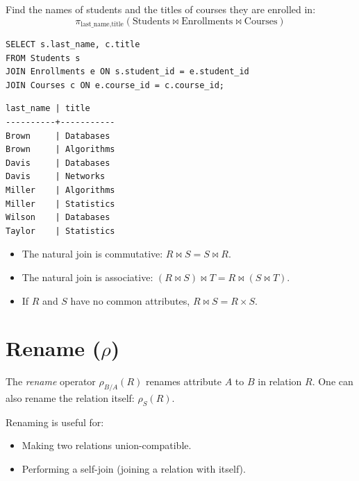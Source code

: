 \begin{example}
Find the names of students and the titles of courses they are enrolled in:
\[
\pi_{\text{last\_name}, \text{title}}(\text{Students} \bowtie \text{Enrollments} \bowtie \text{Courses})
\]

\begin{codeblock}[title=\textbf{Join in SQL}]
\begin{verbatim}
SELECT s.last_name, c.title
FROM Students s
JOIN Enrollments e ON s.student_id = e.student_id
JOIN Courses c ON e.course_id = c.course_id;
\end{verbatim}
\end{codeblock}

\begin{codeoutput}
\begin{verbatim}
last_name | title
----------+-----------
Brown     | Databases
Brown     | Algorithms
Davis     | Databases
Davis     | Networks
Miller    | Algorithms
Miller    | Statistics
Wilson    | Databases
Taylor    | Statistics
\end{verbatim}
\end{codeoutput}
\end{example}

\begin{proposition}
\begin{itemize}
    \item The natural join is commutative: $R \bowtie S = S \bowtie R$.
    \item The natural join is associative: $(R \bowtie S) \bowtie T = R \bowtie (S \bowtie T)$.
    \item If $R$ and $S$ have no common attributes, $R \bowtie S = R \times S$.
\end{itemize}
\end{proposition}

\section{Rename ($\rho$)}

\begin{definition}[Rename]
The \emph{rename} operator $\rho_{B/A}(R)$ renames attribute $A$ to $B$
in relation $R$. One can also rename the relation itself: $\rho_S(R)$.
\end{definition}

Renaming is useful for:
\begin{itemize}
    \item Making two relations union-compatible.
    \item Performing a self-join (joining a relation with itself).
\end{itemize}

